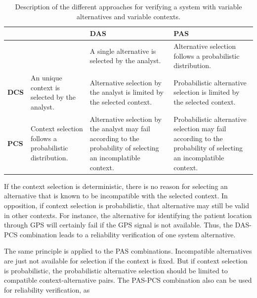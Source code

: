 \begin{table}[h]
{\renewcommand{\arraystretch}{1.5}
\begin{tabularx}{\textwidth}{@{}l|XXX@{}}
\toprule
             &                                                         & \textbf{DAS}                                                                                                      & \textbf{PAS}                                                                                                     \\ \midrule
             &                                                         & A single alternative is selected by the analyst.                                                                  & Alternative selection follows a probabilistic distribution.                                                      \\
\textbf{DCS} & An unique context is selected by the analyst.           & Alternative selection by the analyst is limited by the selected context.                                          & Probabilistic alternative selection is limited by the selected context.                                          \\
\textbf{PCS} & Context selection follows a probabilistic distribution. & Alternative selection by the analyst may fail according to the probability of selecting an incomplatible context. & Probabilistic alternative selection may fail according to the probability of selecting an incomplatible context. \\ \bottomrule
\end{tabularx}
}
\caption{Description of the different approaches for verifying a system with variable alternatives and variable contexts.}
\end{table}

If the context selection is deterministic, there is no reason for selecting an alternative that is known to be incompatible with the selected context. In opposition, if context selection is probabilistic, that alternative may still be valid in other contexts. For instance, the alternative for identifying the patient location through GPS will certainly fail if the GPS signal is not available. Thus, the DAS-PCS combination leads to a reliability verification of one system alternative.

The same principle is applied to the PAS combinations. Incompatible alternatives are just not available for selection if the context is fixed. But if context selection is probabilistic, the probabilistic alternative selection should be limited to compatible context-alternative pairs. The PAS-PCS combination also can be used for reliability verification, as 






